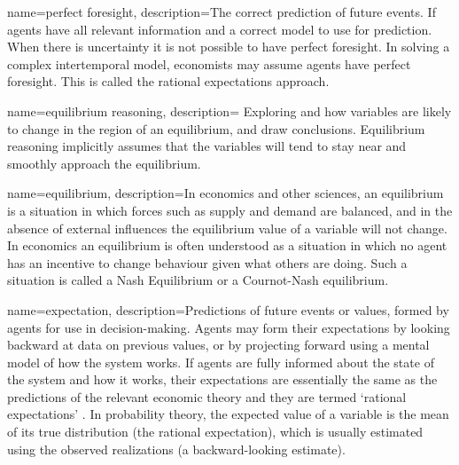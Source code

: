 {
name=perfect foresight,
description={The correct prediction of future events. If agents have  all relevant information and  a correct model to use for prediction. When there is uncertainty it is not possible to have perfect foresight. In solving a complex intertemporal model, economists may assume agents have perfect foresight. This is called the rational expectations approach.}
}

{
name=equilibrium reasoning,
description={%
Exploring and how variables are likely to change in the region of an \gls{equilibrium}, and draw conclusions. %
Equilibrium reasoning implicitly assumes that the variables will tend to stay near and smoothly approach the equilibrium.}
}

{
name=equilibrium,
description={In economics and other sciences, an equilibrium is a situation in which forces such as supply and demand are balanced, and in the absence of external influences the equilibrium value of a variable will not change. In economics an equilibrium is often understood %
as a situation in which no agent has an incentive to change behaviour given what others are doing. Such a situation is called a Nash Equilibrium or a Cournot-Nash equilibrium.}
}


{
name=expectation,
description={Predictions of future events or values, formed by agents for use in decision-making. Agents may form their expectations by looking backward at data on previous values, or by projecting forward using a mental model of how the system works. If agents are fully informed about the state of the system and how it works, their expectations are essentially the same as the predictions of the relevant economic theory and they are termed `rational expectations' \cite{muthRationalExpectationsTheory1961}. In probability theory, the expected value of a variable is the mean of its true distribution (the rational expectation), which is usually estimated using the observed realizations (a backward-looking estimate).}
}

